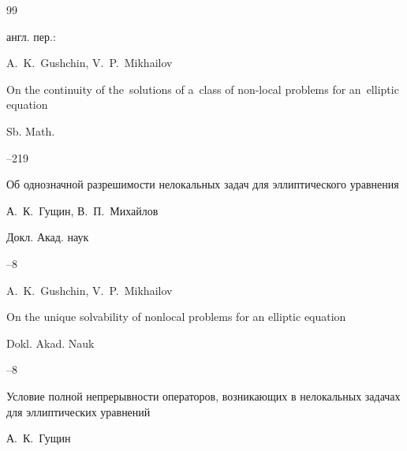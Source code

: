 \begin{thebibliography}{99}



\transl англ. пер.:~

\by A.~K.~Gushchin, V.~P.~Mikhailov

\paper On the continuity of the~solutions of a~class of non-local problems for an~elliptic equation

\jour Sb. Math.




--219








\paper Об однозначной разрешимости нелокальных задач для эллиптического уравнения

\by А.~К.~Гущин, В.~П.~Михайлов

\jour Докл. Акад. наук




--8

\misctransl

\by A.~K.~Gushchin, V.~P.~Mikhailov

\paper On the unique solvability of nonlocal problems for an elliptic equation

\jour Dokl. Akad. Nauk 




–8






\paper Условие полной непрерывности операторов, возникающих в нелокальных задачах для эллиптических уравнений

\by А.~К.~Гущин


\end{thebibliography}
